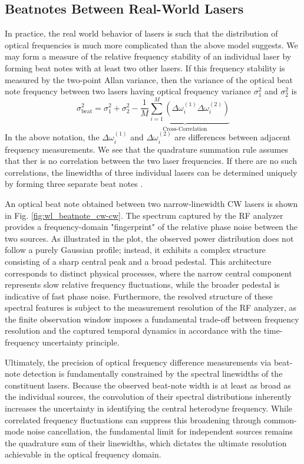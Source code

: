 \subsection{Beatnotes Between Real-World Lasers}

In practice, the real world behavior of lasers is such that the distribution of optical frequencies is much more complicated than the above model suggests. We may form a measure of the relative frequency stability of an individual laser by forming beat notes with at least two other lasers. If this frequency stability is measured by the two-point Allan variance, then the variance of the optical beat note frequency between two lasers having optical frequency variance $\sigma^2_{1}$ and $\sigma^2_{2}$ is \cite{allan_oscillator_stability}
\begin{equation}
	\sigma^2_\mathrm{beat} = \sigma^2_1 + \sigma^2_2 - \underbrace{\frac{1}{M}\sum_{i=1}^{M}\left(\Delta \omega^{(1)}_{i}\Delta \omega^{(2)}_{i}\right)}_{\text{Cross-Correlation}}
\end{equation}
In the above notation, the $\Delta \omega^{(1)}_{i}$ and $\Delta \omega^{(2)}_{i}$ are differences between adjacent frequency measurements. We see that the quadrature summation rule assumes that ther is no correlation between the two laser frequencies. If there are no such correlations, the linewidths of three individual lasers can be determined uniquely by forming three separate beat notes \cite{allan_oscillator_stability}.

An optical beat note obtained between two narrow-linewidth CW lasers is shown in Fig. \ref{fig:wl_beatnote_cw-cw}. The spectrum captured by the RF analyzer provides a frequency-domain "fingerprint" of the relative phase noise between the two sources. As illustrated in the plot, the observed power distribution does not follow a purely Gaussian profile; instead, it exhibits a complex structure consisting of a sharp central peak and a broad pedestal. This architecture corresponds to distinct physical processes, where the narrow central component represents slow relative frequency fluctuations, while the broader pedestal is indicative of fast phase noise. Furthermore, the resolved structure of these spectral features is subject to the measurement resolution of the RF analyzer, as the finite observation window imposes a fundamental trade-off between frequency resolution and the captured temporal dynamics in accordance with the time-frequency uncertainty principle.

Ultimately, the precision of optical frequency difference measurements via beat-note detection is fundamentally constrained by the spectral linewidths of the constituent lasers. Because the observed beat-note width is at least as broad as the individual sources, the convolution of their spectral distributions inherently increases the uncertainty in identifying the central heterodyne frequency. While correlated frequency fluctuations can suppress this broadening through common-mode noise cancellation, the fundamental limit for independent sources remains the quadrature sum of their linewidths, which dictates the ultimate resolution achievable in the optical frequency domain.

